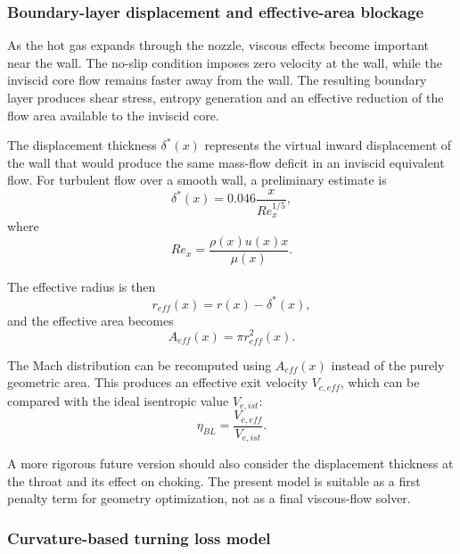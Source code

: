 \documentclass[11pt,a4paper]{article}
\begin{document}
\subsubsection{Boundary-layer displacement and effective-area blockage}

As the hot gas expands through the nozzle, viscous effects become important near the wall. The no-slip condition imposes zero velocity at the wall, while the inviscid core flow remains faster away from the wall. The resulting boundary layer produces shear stress, entropy generation and an effective reduction of the flow area available to the inviscid core.

The displacement thickness $\delta^*(x)$ represents the virtual inward displacement of the wall that would produce the same mass-flow deficit in an inviscid equivalent flow. For turbulent flow over a smooth wall, a preliminary estimate is
\begin{equation}
\delta^*(x)=0.046\frac{x}{Re_x^{1/5}},
\label{eq:delta_star}
\end{equation}
where
\begin{equation}
Re_x=\frac{\rho(x)u(x)x}{\mu(x)}.
\label{eq:Rex}
\end{equation}

The effective radius is then
\begin{equation}
r_{eff}(x)=r(x)-\delta^*(x),
\label{eq:reff}
\end{equation}
and the effective area becomes
\begin{equation}
A_{eff}(x)=\pi r_{eff}^2(x).
\label{eq:Aeff}
\end{equation}

The Mach distribution can be recomputed using $A_{eff}(x)$ instead of the purely geometric area. This produces an effective exit velocity $V_{e,eff}$, which can be compared with the ideal isentropic value $V_{e,ist}$:
\begin{equation}
\boxed{\eta_{BL}=\frac{V_{e,eff}}{V_{e,ist}}}.
\label{eq:eta_BL}
\end{equation}

A more rigorous future version should also consider the displacement thickness at the throat and its effect on choking. The present model is suitable as a first penalty term for geometry optimization, not as a final viscous-flow solver.

\subsubsection{Curvature-based turning loss model}
\end{document}
